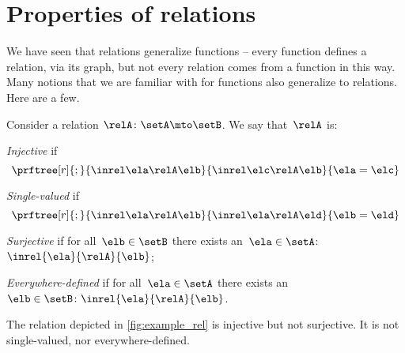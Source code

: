 
\section{Properties of relations}
We have seen that relations generalize functions -- every function defines a relation, via its graph, but not every relation comes from a function in this way.
Many notions that we are familiar with for functions also generalize to relations.
Here are a few.

\begin{ctdefinition}
    \label{def:rel_properties}
    Consider a relation $\relA \colon \setA \mto \setB$.
    We say that~$\relA$ is:
    \begin{compactenum}
        \item \emph{Injective} if
              \begin{equation}
                  \prftree[r]{;}{
                      \inrel \ela \relA \elb
                  }{
                      \inrel \elc \relA \elb
                  }{
                      \ela=\elc
                  }
              \end{equation}
        \item \emph{Single-valued} if
              \begin{equation}
                  \prftree[r]{;}{
                      \inrel \ela \relA \elb
                  }{
                      \inrel \ela \relA \eld
                  }{
                      \elb = \eld
                  }
              \end{equation}
        \item \emph{Surjective} if for all~$\elb\in \setB$ there exists an~$\ela\in \setA$:~$\inrel{\ela}{\relA}{\elb}$;
        \item \emph{Everywhere-defined} if for all~$\ela\in \setA$ there exists an ~$\elb \in \setB\colon \inrel{\ela}{\relA}{\elb}$.
    \end{compactenum}
\end{ctdefinition}

\begin{example}
    The relation depicted in \cref{fig:example_rel} is injective but not surjective.
    It is not single-valued, nor everywhere-defined.
\end{example}

